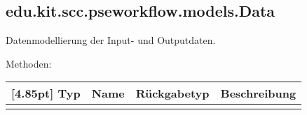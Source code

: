 		
 
        
            
            
         \subsection{edu.kit.scc.pseworkflow.models.Data}   
	         Datenmodellierung der Input- und Outputdaten.
	         
	         Methoden:
	         \begin{center}
	         	\setlength\tabcolsep{5pt}
	         	\renewcommand{\arraystretch}{1.5}
	         	
	         	\begin{tabularx}{\textwidth}{|l|l|l|X|}
	         		\hline
	         		\rowcolor[gray]{0.75}[4.85pt]
	         		Typ & Name & Rückgabetyp & Beschreibung \\ \hline 
	         		&&& \\
	         		\hline
	         	\end{tabularx}
	         \end{center}
	         

